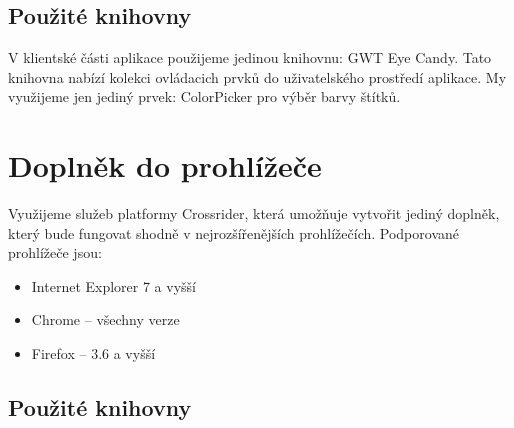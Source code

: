 \subsection{Použité knihovny}

V klientské části aplikace použijeme jedinou knihovnu: GWT Eye Candy.
Tato knihovna nabízí kolekci ovládacich prvků do uživatelského prostředí aplikace.
My využijeme jen jediný prvek: ColorPicker pro výběr barvy štítků.

\section{Doplněk do prohlížeče}

Využijeme služeb platformy Crossrider, která umožňuje vytvořit jediný doplněk, který bude fungovat shodně v nejrozšířenějších prohlížečích.
Podporované prohlížeče jsou:
\begin{itemize}
    \item Internet Explorer 7 a vyšší
    \item Chrome -- všechny verze
    \item Firefox -- 3.6 a vyšší
\end{itemize}

\subsection{Použité knihovny}


